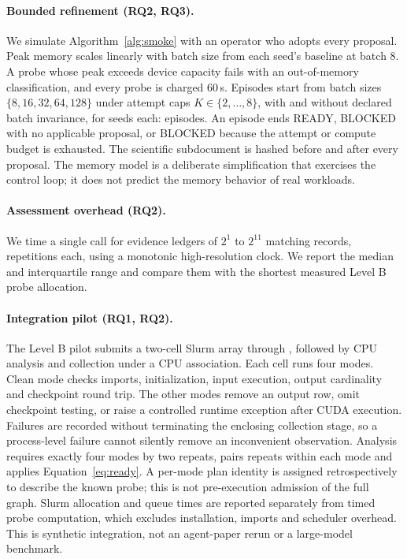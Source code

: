 \paragraph{Bounded refinement (RQ2, RQ3).} We simulate Algorithm~\ref{alg:smoke} with an operator who adopts every proposal. Peak memory scales linearly with batch size from each seed's baseline at batch 8. A probe whose peak exceeds device capacity fails with an out-of-memory classification, and every probe is charged 60\,s. Episodes start from batch sizes $\{8,16,32,64,128\}$ under attempt caps $K\in\{2,\dots,8\}$, with and without declared batch invariance, for \LocalSeeds{} seeds each: \RefinementEpisodes{} episodes. An episode ends READY, BLOCKED with no applicable proposal, or BLOCKED because the attempt or compute budget is exhausted. The scientific subdocument is hashed before and after every proposal. The memory model is a deliberate simplification that exercises the control loop; it does not predict the memory behavior of real workloads.

\paragraph{Assessment overhead (RQ2).} We time a single  call for evidence ledgers of $2^1$ to $2^{11}$ matching records, \OverheadRepeats{} repetitions each, using a monotonic high-resolution clock. We report the median and interquartile range and compare them with the shortest measured Level B probe allocation.

\paragraph{Integration pilot (RQ1, RQ2).} The Level B pilot submits a two-cell Slurm array through \upstream{}, followed by CPU analysis and collection under a CPU association. Each cell runs four modes. Clean mode checks imports, initialization, input execution, output cardinality and checkpoint round trip. The other modes remove an output row, omit checkpoint testing, or raise a controlled runtime exception after CUDA execution. Failures are recorded without terminating the enclosing collection stage, so a process-level failure cannot silently remove an inconvenient observation. Analysis requires exactly four modes by two repeats, pairs repeats within each mode and applies Equation~\eqref{eq:ready}. A per-mode plan identity is assigned retrospectively to describe the known probe; this is not pre-execution admission of the full graph. Slurm allocation and queue times are reported separately from timed probe computation, which excludes installation, imports and scheduler overhead. This is synthetic integration, not an agent-paper rerun or a large-model benchmark.

